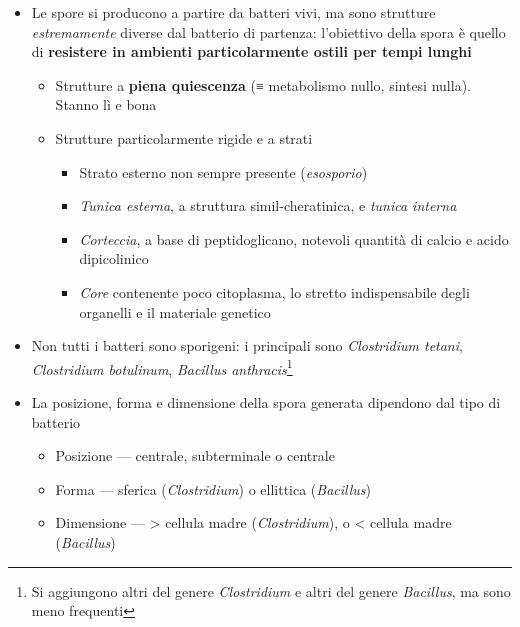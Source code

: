 \documentclass[italian,]{article}
\providecommand{\tightlist}{%
  \setlength{\itemsep}{0pt}\setlength{\parskip}{0pt}}
\newcommand{\asidefigure}[2]{\marginpar{\phantom{Img:}\newline\texttt{[image: \#1]}\\\footnotesize\emph{#2}}}
\begin{document}
\begin{itemize}
\tightlist
\item
  Le spore si producono a partire da batteri vivi, ma sono strutture
  \emph{estremamente} diverse dal batterio di partenza: l'obiettivo
  della spora è quello di \textbf{resistere in ambienti particolarmente
  ostili per tempi lunghi}

  \begin{itemize}
  \tightlist
  \item
    Strutture a \textbf{piena quiescenza} (≡ metabolismo nullo, sintesi
    nulla). Stanno lì e bona
  \item
    Strutture particolarmente rigide e a strati
    \asidefigure{img/anatomia-spore.png}{}

    \begin{itemize}
    \tightlist
    \item
      Strato esterno non sempre presente (\emph{esosporio})
    \item
      \emph{Tunica esterna}, a struttura simil-cheratinica, e
      \emph{tunica interna}
    \item
      \emph{Corteccia}, a base di peptidoglicano, notevoli quantità di
      calcio e acido dipicolinico
    \item
      \emph{Core} contenente poco citoplasma, lo stretto indispensabile
      degli organelli e il materiale genetico
    \end{itemize}
  \end{itemize}
\item
  Non tutti i batteri sono sporigeni: i principali sono
  \emph{Clostridium tetani}, \emph{Clostridium botulinum},
  \emph{Bacillus anthracis}\footnote{Si aggiungono altri del genere
    \emph{Clostridium} e altri del genere \emph{Bacillus}, ma sono meno
    frequenti}
\item
  La posizione, forma e dimensione della spora generata dipendono dal
  tipo di batterio

  \begin{itemize}
  \tightlist
  \item
    Posizione --- centrale, subterminale o centrale
  \item
    Forma --- sferica (\emph{Clostridium}) o ellittica (\emph{Bacillus})
  \item
    Dimensione --- \textgreater{} cellula madre (\emph{Clostridium}), o
    \textless{} cellula madre (\emph{Bacillus})
  \end{itemize}
\end{itemize}
\end{document}
